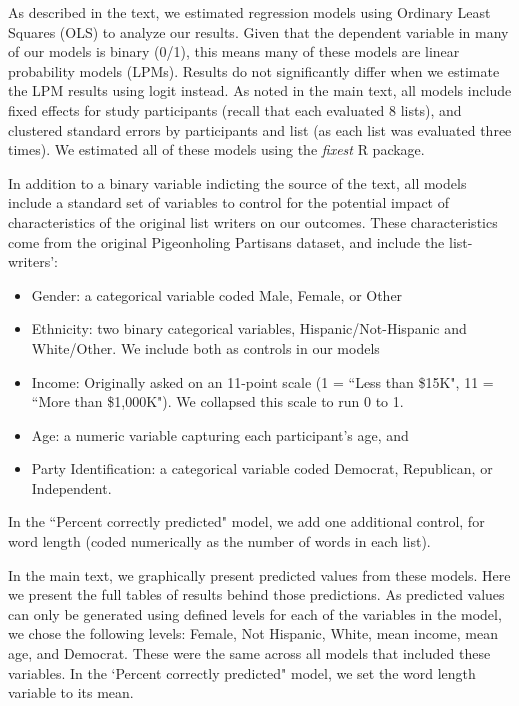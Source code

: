 \documentclass[11pt]{article}
\begin{document}
As described in the text, we estimated regression models using Ordinary Least Squares (OLS) to analyze our results. Given that the dependent variable in many of our models is binary (0/1), this means many of these models are linear probability models (LPMs). Results do not significantly differ when we estimate the LPM results using logit instead. As noted in the main text, all models include fixed effects for study participants (recall that each evaluated 8 lists), and clustered standard errors by participants and list (as each list was evaluated three times). We estimated all of these models using the \textit{fixest} R package.

In addition to a binary variable indicting the source of the text, all models include a standard set of variables to control for the potential impact of characteristics of the original list writers on our outcomes. These characteristics come from the original Pigeonholing Partisans dataset, and include the list-writers':

\begin{itemize}
    \item Gender: a categorical variable coded Male, Female, or Other
    \item Ethnicity: two binary categorical variables, Hispanic/Not-Hispanic and White/Other. We include both as controls in our models
    \item Income: Originally asked on an 11-point scale (1 = ``Less than \$15K", 11 = ``More than \$1,000K"). We collapsed this scale to run 0 to 1.
    \item Age: a numeric variable capturing each participant's age, and
    \item Party Identification: a categorical variable coded Democrat, Republican, or Independent.
\end{itemize}

In the ``Percent correctly predicted" model, we add one additional control, for word length (coded numerically as the number of words in each list).

In the main text, we graphically present predicted values from these models. Here we present the full tables of results behind those predictions. As predicted values can only be generated using defined  levels for each of the variables in the model, we chose the following levels: Female, Not Hispanic, White, mean income, mean age, and Democrat. These were the same across all models that included these variables. In the `Percent correctly predicted" model, we set the word length variable to its mean.
\end{document}
